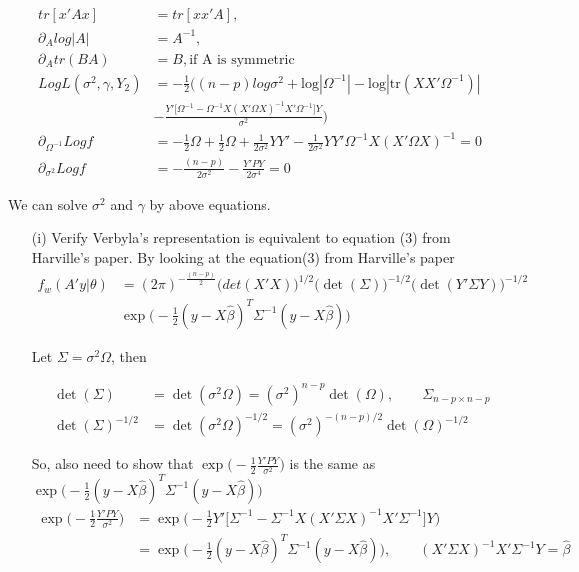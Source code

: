 \begin{itemize}
 \begin{align*}
    tr[x'Ax] &= tr[xx'A],\\
    \partial_{A} log |A| &= A^{-1}, \\
    \partial_{A} tr(BA) &= B, \text{if A is symmetric} \\
    Log L(\sigma^2, \gamma, Y_2) &=  -\frac{1}{2} \Big( (n-p) log \sigma^2 + \text{log} | \Omega^{-1}|- \text{log} | \text{tr}(XX' \Omega^{-1})| \\
        & - \frac{Y' \Big[\Omega^{-1} - \Omega^{-1} X (X' \Omega X)^{-1} X' \Omega^{-1}  \Big] Y}{\sigma^2} \Big) \\
    \partial_{\Omega^{-1}} Log f&= - \frac{1}{2} \Omega + \frac{1}{2} \Omega + \frac{1}{2 \sigma^2} YY' - \frac{1}{2 \sigma^2} YY' \Omega^{-1}X(X' \Omega X)^{-1} =0\\
    \partial_{\sigma^2} Log f&= -\frac{(n-p)}{2 \sigma^2}  - \frac{Y' P Y}{2 \sigma^4} =0
\end{align*}

We can solve $\sigma^2$ and $\gamma$ by above equations.

\begin{itemize}
\item[(i)] Verify Verbyla's representation is equivalent to equation (3) from Harville's paper. 
By looking at the equation(3) from Harville's paper
 \begin{align*}
    f_w(A' y| \theta) &= (2\pi)^{-\frac{(n-p)}{2} }  \Big(det(X'X) \Big)^{1/2}  \Big(\det(\Sigma) \Big)^{-1/2}  \Big(\det(Y' \Sigma Y) \Big)^{-1/2} \\
    & \exp \Big(-\frac{1}{2} (y- X \hat{\beta})^T \Sigma^{-1} (y- X \hat{\beta}) \Big)
\end{align*}

Let $\Sigma = \sigma^2 \Omega$, then 

\begin{align*}
\det(\Sigma) &= \det(\sigma^2 \Omega) = ( \sigma^2 )^{n-p} \det(\Omega) , \qquad \Sigma_{n-p \times n-p}\\
\det(\Sigma)^{-1/2} &= \det(\sigma^2 \Omega)^{-1/2} = ( \sigma^2 )^{-(n-p)/2} \det(\Omega)^{-1/2}
\end{align*}

So, also need to show that $\exp \Big(-\frac{1}{2} \frac{Y' P Y}{\sigma^2} \Big)$ is the same as $\exp \Big(-\frac{1}{2} (y- X \hat{\beta})^T \Sigma^{-1} (y- X \hat{\beta}) \Big)$
 \begin{align*}
\exp \Big(-\frac{1}{2} \frac{Y' P Y}{\sigma^2} \Big) &= \exp \Big(-\frac{1}{2} Y' \Big[ \Sigma^{-1} -  \Sigma^{-1} X (X'  \Sigma X)^{-1} X'  \Sigma^{-1} \Big]Y \Big) \\
&= \exp \Big(-\frac{1}{2} (y- X \hat{\beta})^T \Sigma^{-1} (y- X \hat{\beta}) \Big) , \qquad (X'  \Sigma X)^{-1} X'  \Sigma^{-1} Y = \hat{\beta} 
\end{align*}



\end{itemize}
\end{itemize}
